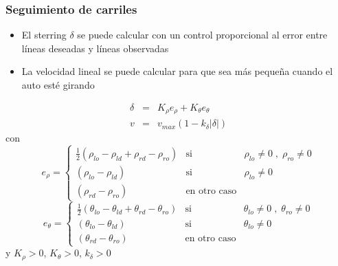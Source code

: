 \begin{frame}\frametitle{Seguimiento de carriles}
  \begin{itemize}
  \item El sterring $\delta$ se puede calcular con un control proporcional al error entre líneas deseadas y líneas observadas
  \item La velocidad lineal se puede calcular para que sea más pequeña cuando el auto esté girando
  \end{itemize}
  \begin{eqnarray*}
    \delta &=& K_\rho e_\rho + K_\theta e_\theta\\
    v &=& v_{max}(1 - k_\delta |\delta|)
  \end{eqnarray*}
  con
  \[
    e_\rho = \left\{ \begin{array}{lcl}
      \frac{1}{2}(\rho_{lo} - \rho_{ld} + \rho_{rd} - \rho_{ro}) & \textrm{si} & \rho_{lo}\neq 0\; , \; \rho_{ro} \neq 0\\
      (\rho_{lo} - \rho_{ld}) & \textrm{si} & \rho_{lo}\neq 0\\
      (\rho_{rd} - \rho_{ro}) & \textrm{en otro caso} & 
      \end{array}
    \right.\]
  \[
    e_\theta = \left\{ \begin{array}{lcl}
      \frac{1}{2}(\theta_{lo} - \theta_{ld} + \theta_{rd} - \theta_{ro}) & \textrm{si} & \theta_{lo}\neq 0\; , \; \theta_{ro} \neq 0\\
      (\theta_{lo} - \theta_{ld}) & \textrm{si} & \theta_{lo}\neq 0\\
      (\theta_{rd} - \theta_{ro}) & \textrm{en otro caso} & 
      \end{array}
    \right.\]
  y $K_\rho > 0$, $K_\theta > 0$, $k_\delta > 0$
\end{frame}

